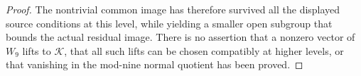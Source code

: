 \begin{proof}
The nontrivial common image has therefore survived all
the displayed source conditions at this level, while
yielding a smaller open subgroup that bounds the actual
residual image.  There is no assertion that a nonzero
vector of $W_9$ lifts to $\mathcal K$, that all such
lifts can be chosen compatibly at higher levels, or that
vanishing in the mod-nine normal quotient has been proved.
\end{proof}
